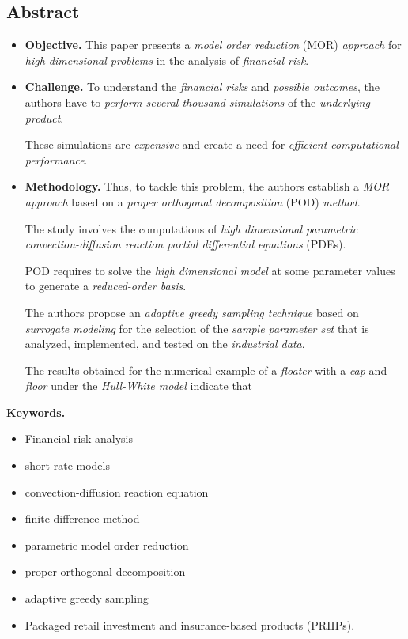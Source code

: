 \documentclass{book}
\numberwithin{equation}{section}
\begin{document}
\subsection*{Abstract}
\begin{itemize}
    \item \textbf{Objective.} This paper presents a \textit{model order reduction} (MOR) \textit{approach} for \textit{high dimensional problems} in the analysis of \textit{financial risk}.
    \item \textbf{Challenge.} To understand the \textit{financial risks} and \textit{possible outcomes}, the authors have to \textit{perform several thousand simulations} of the \textit{underlying product}.
    
    These simulations are \textit{expensive} and create a need for \textit{efficient computational performance}.
    \item \textbf{Methodology.} Thus, to tackle this problem, the authors establish a \textit{MOR approach} based on a \textit{proper orthogonal decomposition} (POD) \textit{method}.
    
    The study involves the computations of \textit{high dimensional parametric convection-diffusion reaction partial differential equations} (PDEs).
    
    POD requires to solve the \textit{high dimensional model} at some parameter values to generate a \textit{reduced-order basis}.
    
    The authors propose an \textit{adaptive greedy sampling technique} based on \textit{surrogate modeling} for the selection of the \textit{sample parameter set} that is analyzed, implemented, and tested on the \textit{industrial data}.
    
    The results obtained for the numerical example of a \textit{floater} with a \textit{cap} and \textit{floor} under the \textit{Hull-White model} indicate that 
\end{itemize}
\textbf{Keywords.}
\begin{itemize}
    \item Financial risk analysis
    \item short-rate models
    \item convection-diffusion reaction equation
    \item finite difference method
    \item parametric model order reduction
    \item proper orthogonal decomposition
    \item adaptive greedy sampling
    \item Packaged retail investment and insurance-based products (PRIIPs).
\end{itemize}
\end{document}
